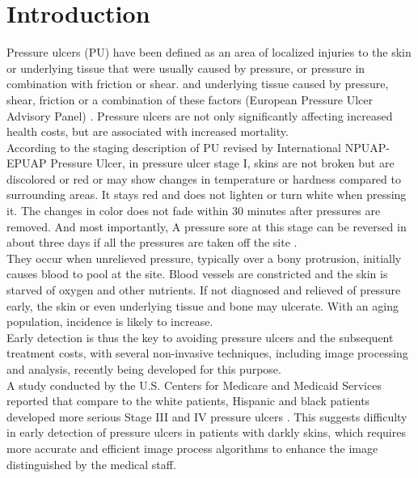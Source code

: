 \chapter{Introduction}
Pressure ulcers (PU) have been defined as an area of localized injuries to the skin or underlying tissue that were usually caused by pressure, or pressure in combination with friction or shear.
and underlying tissue caused by pressure, shear, friction or a combination of these
factors (European Pressure Ulcer Advisory Panel) \cite{epuap}. Pressure ulcers are not only significantly affecting increased health costs, but are associated with increased mortality.\\

According to the staging description of PU revised by International NPUAP- EPUAP Pressure Ulcer, in pressure ulcer stage I, skins are not broken but are discolored or red or may show changes in temperature or hardness compared to surrounding areas. It stays red and does not lighten or turn white when pressing it. The changes in color does not fade within 30 minutes after pressures are removed. And most importantly, A pressure sore at this stage can be reversed in about three days if all the pressures are taken off the site \cite{msktc}.\\

They occur when unrelieved pressure, typically over a bony protrusion, initially causes blood to pool at the site. Blood vessels are constricted and the skin is starved of oxygen and other nutrients. If not diagnosed and relieved of pressure early, the skin or even underlying tissue and bone may ulcerate. With an aging population, incidence is
likely to increase.\\

Early detection is thus the key to avoiding pressure ulcers and the subsequent treatment costs, with several non-invasive techniques, including image processing and analysis, recently being developed for this purpose.\\

A study conducted by the U.S. Centers for Medicare and Medicaid Services reported that compare to the white patients, Hispanic and black patients developed more serious Stage III and IV pressure ulcers \cite{Lyder}. This suggests difficulty in early detection of pressure ulcers in patients with darkly skins, which requires more accurate and efficient image process algorithms to enhance the image distinguished by the medical staff.\\

